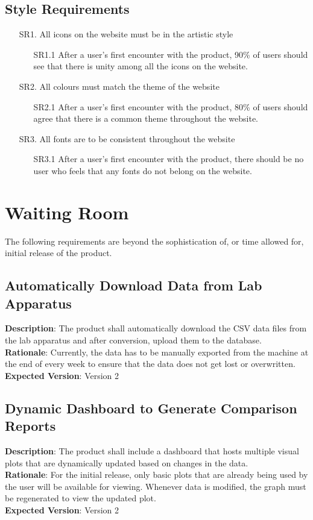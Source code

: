 \documentclass[12pt]{article}
\begin{document}
\subsection{Style Requirements}
\begin{itemize}
  \item [SR1.] All icons on the website must be in the artistic style
  \begin{itemize}
    \item [SR1.1] After a user's first encounter with the product, 90\% of users
    should see that there is unity among all the icons on the website. 
  \end{itemize}
  \item [SR2.] All colours must match the theme of the website
  \begin{itemize}
    \item [SR2.1] After a user's first encounter with the product, 80\% of users
    should agree that there is a common theme throughout the website.
  \end{itemize}
  \item [SR3.] All fonts are to be consistent throughout the website 
  \begin{itemize}
    \item [SR3.1] After a user's first encounter with the product, there should
    be no user who feels that any fonts do not belong on the website. 
  \end{itemize}
\end{itemize}

\section{Waiting Room}
The following requirements are beyond the sophistication of, or time allowed
for, initial release of the product.
\subsection{Automatically Download Data from Lab Apparatus}
\textbf{Description}: The product shall automatically download the CSV data
files from the lab apparatus and after conversion, upload them to the
database.\\
\textbf{Rationale}: Currently, the data has to be manually exported from the
machine at the end of every week to ensure that the data does not get lost or
overwritten.\\
\textbf{Expected Version}: Version 2

\subsection{Dynamic Dashboard to Generate Comparison Reports}
\textbf{Description}: The product shall include a dashboard that hosts multiple
visual plots that are dynamically updated based on changes in the data.\\
\textbf{Rationale}: For the initial release, only basic plots that are already
being used by the user will be available for viewing. Whenever data is modified,
the graph must be regenerated to view the updated plot.\\
\textbf{Expected Version}: Version 2
\end{document}
